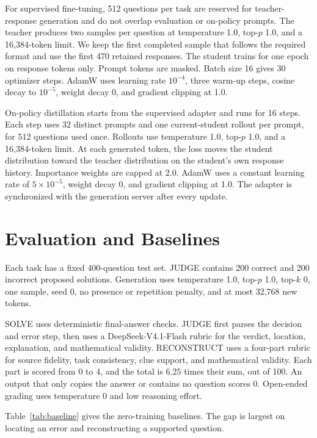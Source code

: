 \documentclass[11pt]{article}
\begin{document}
For supervised fine-tuning, 512 questions per task are reserved for teacher-response generation and do not overlap evaluation or on-policy prompts. The teacher produces two samples per question at temperature 1.0, top-$p$ 1.0, and a 16,384-token limit. We keep the first completed sample that follows the required format and use the first 470 retained responses. The student trains for one epoch on response tokens only. Prompt tokens are masked. Batch size 16 gives 30 optimizer steps. AdamW uses learning rate $10^{-4}$, three warm-up steps, cosine decay to $10^{-5}$, weight decay 0, and gradient clipping at 1.0.

On-policy distillation starts from the supervised adapter and runs for 16 steps. Each step uses 32 distinct prompts and one current-student rollout per prompt, for 512 questions used once. Rollouts use temperature 1.0, top-$p$ 1.0, and a 16,384-token limit. At each generated token, the loss moves the student distribution toward the teacher distribution on the student's own response history. Importance weights are capped at 2.0. AdamW uses a constant learning rate of $5\times10^{-5}$, weight decay 0, and gradient clipping at 1.0. The adapter is synchronized with the generation server after every update.

\section{Evaluation and Baselines}
\label{sec:eval}

Each task has a fixed 400-question test set. JUDGE contains 200 correct and 200 incorrect proposed solutions. Generation uses temperature 1.0, top-$p$ 1.0, top-$k$ 0, one sample, seed 0, no presence or repetition penalty, and at most 32,768 new tokens.

SOLVE uses deterministic final-answer checks. JUDGE first parses the decision and error step, then uses a DeepSeek-V4.1-Flash rubric for the verdict, location, explanation, and mathematical validity. RECONSTRUCT uses a four-part rubric for source fidelity, task consistency, clue support, and mathematical validity. Each part is scored from 0 to 4, and the total is $6.25$ times their sum, out of 100. An output that only copies the answer or contains no question scores 0. Open-ended grading uses temperature 0 and low reasoning effort.

Table~\ref{tab:baseline} gives the zero-training baselines. The gap is largest on locating an error and reconstructing a supported question.
\end{document}
